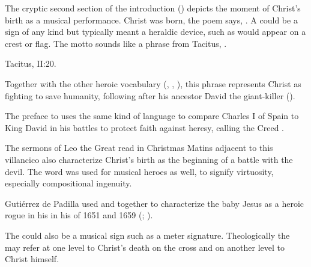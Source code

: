The cryptic second section of the introduction () depicts the
moment of Christ's birth as a musical performance.
Christ was born, the poem says, .
A  could be a sign of any kind but typically meant a heraldic
device, such as would appear on a crest or flag.%
    \Autocite[]{Covarrubias:Tesoro}
The motto  sounds like a phrase from
Tacitus, .%
\begin{Footnote}
    Tacitus,  II:20.
\end{Footnote}
Together with the other heroic vocabulary (,
, ), this phrase represents Christ as
fighting to save humanity, following after his ancestor David the giant-killer
().%
\begin{Footnote}
    The preface to \autocite{Azevedo:Catecismo} uses the same kind of language
    to compare Charles I of Spain to King David in his battles to protect faith
    against heresy, calling the Creed .
\end{Footnote}
The sermons of Leo the Great read in Christmas Matins adjacent to this
villancico also characterize Christ's birth as the beginning of a battle with
the devil.%
    \Autocite[\XXX]{Catholic:Catechismus1614}
The word  was used for musical heroes as well, to signify
virtuosity, especially compositional ingenuity.%
\begin{Footnote}
    \Autocites
    []{Covarrubias:Tesoro}
    [in its musical sense, see the title of][]
    {Sanz:Guitarra}
    Gutiérrez de Padilla used  and  together
    to characterize the baby Jesus as a heroic rogue in his  in
    his  of 1651 and 1659 (;
    ).
\end{Footnote}
The  could also be a musical sign such as a meter signature.
Theologically the  may refer at one level to Christ's death on the
cross and on another level to Christ himself.

